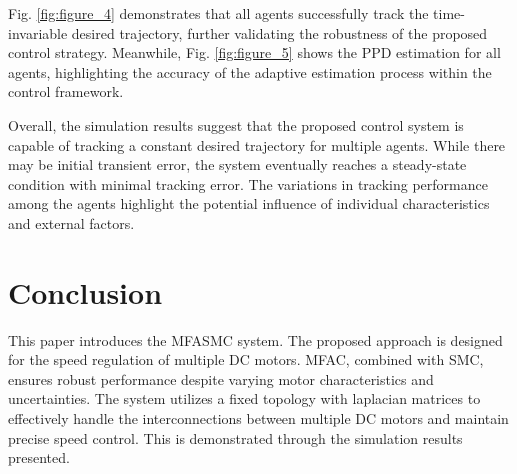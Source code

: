 \documentclass[journal,onecolumn]{IEEEtran}
\begin{document}
Fig. \ref{fig:figure_4} demonstrates that all agents successfully track the time-invariable desired trajectory, further validating the robustness of the proposed control strategy. Meanwhile, Fig. \ref{fig:figure_5} shows the PPD estimation for all agents, highlighting the accuracy of the adaptive estimation process within the control framework.

Overall, the simulation results suggest that the proposed control system is capable of tracking a constant desired trajectory for multiple agents. While there may be initial transient error, the system eventually reaches a steady-state condition with minimal tracking error. The variations in tracking performance among the agents highlight the potential influence of individual characteristics and external factors.

\section{Conclusion}

This paper introduces the MFASMC system. The proposed approach is designed for the speed regulation of multiple DC motors. MFAC, combined with SMC, ensures robust performance despite varying motor characteristics and uncertainties. The system utilizes a fixed topology with laplacian matrices to effectively handle the interconnections between multiple DC motors and maintain precise speed control. This is demonstrated through the simulation results presented.






\end{document}
